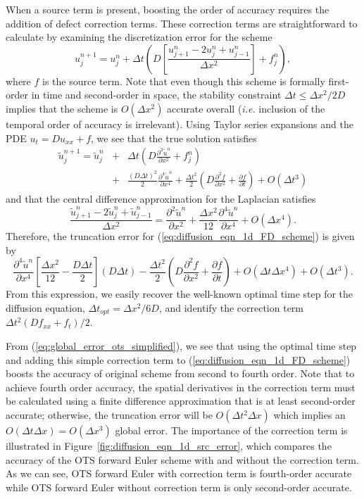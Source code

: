 \documentclass[fleqn,12pt,twoside]{article}
\newcommand{\beq}{\begin{equation}}
\newcommand{\eeq}{\end{equation}}
\newcommand{\bea}{\begin{eqnarray}}
\newcommand{\eea}{\end{eqnarray}}
\def\pt{\partial t}
\def\px{\partial x}
\def\tu{\tilde{u}}
\def\dt{\Delta t}
\def\dx{\Delta x}
\def\dto{\dt_{opt}}
\def\ie{\emph{i.e. }}
\begin{document}
When a source term is present, boosting the order of accuracy requires
the addition of defect correction terms.  These correction terms are 
straightforward to calculate by examining the discretization error for the
scheme
\beq
  u^{n+1}_j = u^{n}_j 
  + \dt 
    \left( D \left[\frac{u^{n}_{j+1} -2 u^{n}_j + u^{n}_{j-1}}{\dx^2}\right] 
         + f^n_j \right),
  \label{eq:diffusion_eqn_1d_FD_scheme}
\eeq
where $f$ is the source term.  Note that even though this scheme is formally 
first-order in time and second-order in space, the stability constraint 
$\dt \le \dx^2/2D$ implies that the scheme is $O(\dx^2)$ accurate 
overall (\ie inclusion of the temporal order of accuracy is irrelevant).
Using Taylor series expansions and the PDE $u_t = D u_{xx} + f$,
we see that the true solution satisfies
\bea
  \tu^{n+1}_j = \tu^{n}_j 
  &+& \dt \left( D \frac{\partial^2 \tu^n}{\px^2} + f^n_j \right)
  \nonumber \\
  &+& \frac{(D\dt)^2}{2} \frac{\partial^4 \tu^n}{\px^4} 
  + \frac{\dt^2}{2} \left( D\frac{\partial^2 f}{\px^2}
                         + \frac{\partial f}{\pt} \right)
  + O \left( \dt^3 \right)
  \label{eq:diffusion_eqn_1d_time_err} 
\eea
and that the central difference approximation for the Laplacian satisfies
\beq
  \frac{\tu^{n}_{j+1} -2 \tu^{n}_j + \tu^{n}_{j-1}}{\dx^2}  =
  \frac{\partial^2 \tu^n}{\px^2} 
  + \frac{\dx^2}{12} \frac{\partial^4 \tu^n}{\px^4} 
  + O(\dx^4).
  \label{eq:diffusion_eqn_1d_space_err}
\eeq
Therefore, the truncation error for (\ref{eq:diffusion_eqn_1d_FD_scheme})
is given by
\beq
  \frac{\partial^4 \tu^n}{\px^4} 
    \left[ \frac{\dx^2}{12} - \frac{D \dt}{2} \right] (D \dt)
    - \frac{\dt^2}{2} \left( D \frac{\partial^2 f}{\px^2} 
                           + \frac{\partial f}{\pt} \right)
      + O(\dt \dx^4) + O(\dt^3).
  \label{eq:diffusion_eqn_1d_trunc_err}
\eeq
From this expression, we easily recover the well-known optimal time step for
the diffusion equation, $\dto = \dx^2/6D$, and identify the correction term 
$\dt^2 \left( D f_{xx} + f_t \right)  /2$.

From (\ref{eq:global_error_ots_simplified}), we see that using the optimal 
time step and adding this simple correction term to 
(\ref{eq:diffusion_eqn_1d_FD_scheme}) boosts the accuracy of original scheme 
from second to fourth order.  Note that to achieve fourth order accuracy, 
the spatial derivatives in the correction term must be calculated using a
finite difference approximation that is at least second-order accurate; 
otherwise, the truncation error will be $O(\dt^2 \dx)$ which implies an 
$O(\dt \dx) = O(\dx^3)$ global error. 
The importance of the correction term is illustrated in 
Figure~\ref{fig:diffusion_eqn_1d_src_error}, which compares the accuracy of 
the OTS forward Euler scheme with and without the correction term.  As we 
can see, OTS forward Euler with correction term is fourth-order accurate 
while OTS forward Euler without correction term is only second-order 
accurate.  
\end{document}

